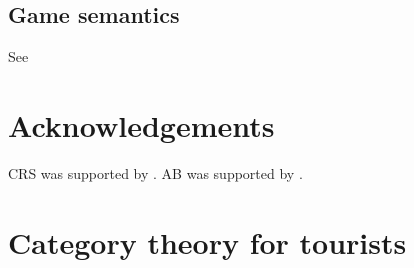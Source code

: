 \documentclass[aps,twocolumn]{revtex4}
\begin{document}
\subsection{Game semantics}
See \cite{Mellies2009}

\section*{Acknowledgements} 

CRS was supported by . 
AB was supported by .

\appendix
\section{Category theory for tourists}
%
%
%
%
%
%
%
\end{document}
